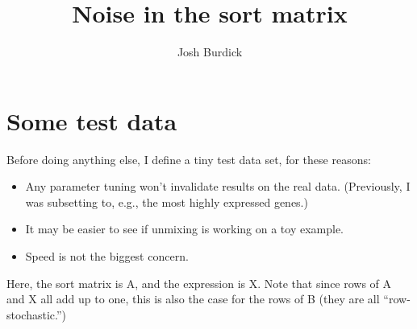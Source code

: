 \documentclass{article}\usepackage[]{graphicx}\usepackage[]{color}
\title{Noise in the sort matrix}
\author{Josh Burdick}
\begin{document}
\maketitle




\section{Some test data}

Before doing anything else, I define a tiny test data set, for these reasons:

\begin{itemize}

\item Any parameter tuning won't invalidate results on the real data. (Previously,
I was subsetting to, e.g., the most highly expressed genes.)

\item It may be easier to see if unmixing is working on a toy example.

\item Speed is not the biggest concern.

\end{itemize}

Here, the sort matrix is A, and the expression is X.
Note that since rows of A and X all add up to one, this is also
the case for the rows of B (they are all ``row-stochastic.'')
\end{document}
